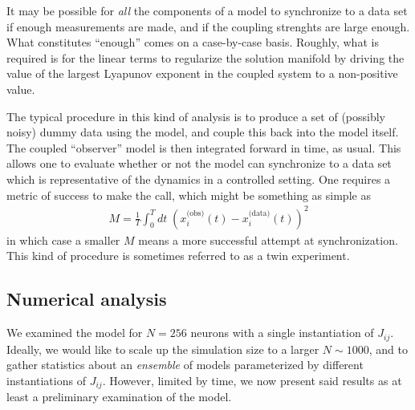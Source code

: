 \documentclass{article} %
\begin{document}
It may be possible for \emph{all} the components of a model to synchronize to a data set if enough measurements are made, and if the coupling strenghts are large enough.  What constitutes ``enough'' comes on a case-by-case basis.  Roughly, what is required is for the linear terms to regularize the solution manifold by driving the value of the largest Lyapunov exponent in the coupled system to a non-positive value.

The typical procedure in this kind of analysis is to produce a set of (possibly noisy) dummy data using the model, and couple this back into the model itself.  The coupled ``observer'' model is then integrated forward in time, as usual. This allows one to evaluate whether or not the model can synchronize to a data set which is representative of the dynamics in a controlled setting.  One requires a metric of success to make the call, which might be something as simple as
\begin{align}
	M = \frac{1}{T} \int_0^T dt \; \left(x_i^\text{(obs)}(t) - x_i^\text{(data)}(t)\right)^2
\end{align}
in which case a smaller $M$ means a more successful attempt at synchronization.  This kind of procedure is sometimes referred to as a twin experiment.

\subsection{Numerical analysis}
We examined the model for $N=256$ neurons with a single instantiation of $J_{ij}$.  Ideally, we would like to scale up the simulation size to a larger $N \sim 1000$, and to gather statistics about an \emph{ensemble} of models parameterized by different instantiations of $J_{ij}$.  However, limited by time, we now present said results as at least a preliminary examination of the model.
\end{document}
